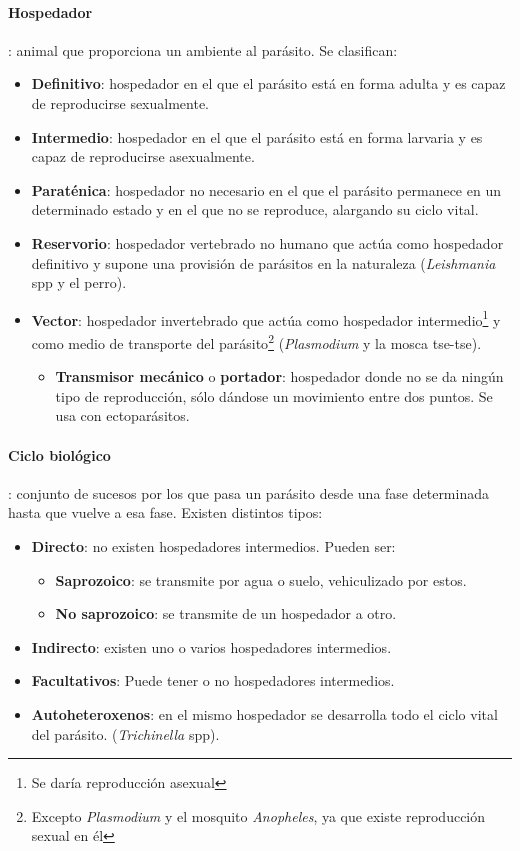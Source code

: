 \documentclass[10pt,a4paper,onecolumn,openany]{book}
\begin{document}
\paragraph{Hospedador}: animal que proporciona un ambiente al parásito. Se clasifican:
	\begin{itemize}[itemsep=0pt,parsep=0pt,topsep=0pt,partopsep=0pt]
		\item \textbf{Definitivo}: hospedador en el que el parásito está en forma adulta y es capaz de reproducirse sexualmente.
		\item\textbf{Intermedio}: hospedador en el que el parásito está en forma larvaria y es capaz de reproducirse asexualmente.
		\item\textbf{Paraténica}: hospedador no necesario en el que el parásito permanece en un determinado estado y en el que no se reproduce, alargando su ciclo vital.
		\item\textbf{Reservorio}: hospedador vertebrado no humano que actúa como hospedador definitivo y supone una provisión de parásitos en la naturaleza (\textit{Leishmania} spp y el perro).
		\item\textbf{Vector}: hospedador invertebrado que actúa como hospedador intermedio\footnote{Se daría reproducción asexual} y como medio de transporte del parásito\footnote{Excepto \textit{Plasmodium} y el mosquito \textit{Anopheles}, ya que existe reproducción sexual en él} (\textit{Plasmodium} y la mosca tse-tse).
		\begin{itemize}[itemsep=0pt,parsep=0pt,topsep=0pt,partopsep=0pt]
			\item \textbf{Transmisor mecánico} o \textbf{portador}: hospedador donde no se da ningún tipo de reproducción, sólo dándose un movimiento entre dos puntos. Se usa con ectoparásitos.
		\end{itemize}
	\end{itemize}
\paragraph{Ciclo biológico}: conjunto de sucesos por los que pasa un parásito desde una fase determinada hasta que vuelve a esa fase. Existen distintos tipos:
\begin{itemize}[itemsep=0pt,parsep=0pt,topsep=0pt,partopsep=0pt]
	\item \textbf{Directo}: no existen hospedadores intermedios. Pueden ser:
	\begin{itemize}[itemsep=0pt,parsep=0pt,topsep=0pt,partopsep=0pt]
		\item \textbf{Saprozoico}: se transmite por agua o suelo, vehiculizado por estos.
		\item\textbf{No saprozoico}: se transmite de un hospedador a otro.
	\end{itemize}
	\item\textbf{Indirecto}: existen uno o varios hospedadores intermedios.
	\item\textbf{Facultativos}: Puede tener o no hospedadores intermedios.
	\item\textbf{Autoheteroxenos}: en el mismo hospedador se desarrolla todo el ciclo vital del parásito. (\textit{Trichinella} spp).
\end{itemize}
\end{document}
